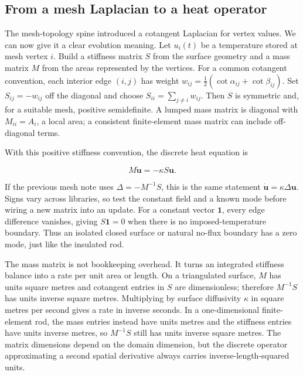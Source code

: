 \subsection{From a mesh Laplacian to a heat operator}\label{04-visual-computing-ii-ch030-from-a-mesh-laplacian-to-a-heat-operator}

\hypertarget{04-visual-computing-ii-ch030-from-a-mesh-laplacian-to-a-heat-operator}{}

The mesh-topology spine introduced a cotangent Laplacian for vertex values. We can now give it a clear evolution meaning. Let \(u_i(t)\) be a temperature stored at mesh vertex \(i\). Build a stiffness matrix \(S\) from the surface geometry and a mass matrix \(M\) from the areas represented by the vertices. For a common cotangent convention, each interior edge \((i,j)\) has weight \(w_{ij}=\tfrac12(\cot\alpha_{ij}+\cot\beta_{ij})\). Set \(S_{ij}=-w_{ij}\) off the diagonal and choose \(S_{ii}=\sum_{j\ne i}w_{ij}\). Then \(S\) is symmetric and, for a suitable mesh, positive semidefinite. A lumped mass matrix is diagonal with \(M_{ii}=A_i\), a local area; a consistent finite-element mass matrix can include off-diagonal terms.

With this positive stiffness convention, the discrete heat equation is

\[
M\dot{\mathbf u}=-\kappa S\mathbf u.
\]

If the previous mesh note uses \(\Delta=-M^{-1}S\), this is the same statement \(\dot{\mathbf u}=\kappa\Delta\mathbf u\). Signs vary across libraries, so test the constant field and a known mode before wiring a new matrix into an update. For a constant vector \(\mathbf 1\), every edge difference vanishes, giving \(S\mathbf 1=0\) when there is no imposed-temperature boundary. Thus an isolated closed surface or natural no-flux boundary has a zero mode, just like the insulated rod.

The mass matrix is not bookkeeping overhead. It turns an integrated stiffness balance into a rate per unit area or length. On a triangulated surface, \(M\) has units square metres and cotangent entries in \(S\) are dimensionless; therefore \(M^{-1}S\) has units inverse square metres. Multiplying by surface diffusivity \(\kappa\) in square metres per second gives a rate in inverse seconds. In a one-dimensional finite-element rod, the mass entries instead have units metres and the stiffness entries have units inverse metres, so \(M^{-1}S\) still has units inverse square metres. The matrix dimensions depend on the domain dimension, but the discrete operator approximating a second spatial derivative always carries inverse-length-squared units.

